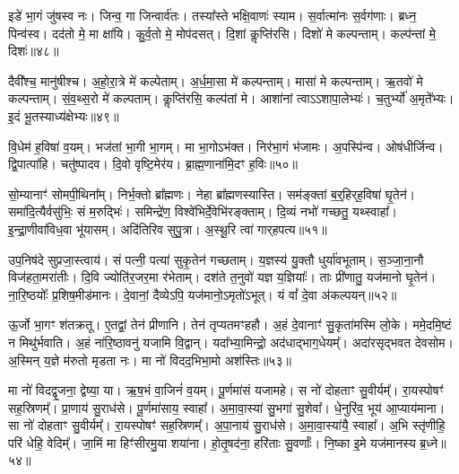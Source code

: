 इडे॑ भा॒गं जु॑षस्व नः।
जिन्व॒ गा जिन्वार्व॑तः।
तस्या᳚स्ते भक्षि॒वाणः॑ स्याम।
स॒र्वात्मा॑नः स॒र्वग॑णाः।
ब्रध्न॒ पिन्व॑स्व।
दद॑तो मे॒ मा क्षा॑यि।
कु॒र्व॒तो मे॒ मोप॑दसत्।
दि॒शां कॢप्ति॑रसि।
दिशो॑ मे कल्पन्ताम्।
कल्प॑न्तां मे॒ दिशः॑॥४८॥

दैवी᳚श्च॒ मानु॑षीश्च।
अ॒हो॒रा॒त्रे मे॑ कल्पेताम्।
अ॒र्ध॒मा॒सा मे॑ कल्पन्ताम्।
मासा॑ मे कल्पन्ताम्।
ऋ॒तवो॑ मे कल्पन्ताम्।
सं॒व॒थ्स॒रो मे॑ कल्पताम्।
कॢप्ति॑रसि॒ कल्प॑तां मे।
आशा॑नां त्वा\-ऽऽशापा॒लेभ्यः॑।
च॒तुर्भ्यो॑ अ॒मृते᳚भ्यः।
इ॒दं भू॒तस्याध्य॑क्षेभ्यः॥४९॥

वि॒धेम॑ ह॒विषा॑ व॒यम्।
भज॑तां भा॒गी भा॒गम्।
मा भा॒गो\-ऽभ॑क्त।
निर॑भा॒गं भ॑जामः।
अ॒पस्पि॑न्व।
ओष॑धीर्जिन्व।
द्वि॒पात्पा॑हि।
चतु॑ष्पादव।
दि॒वो वृष्टि॒मेर॑य।
ब्रा॒ह्म॒णाना॑मि॒दꣳ ह॒विः॥५०॥

सो॒म्यानाꣳ॑ सोमपी॒थिना᳚म्।
निर्भ॒क्तो ब्रा᳚ह्मणः।
नेहा ब्रा᳚ह्मणस्यास्ति।
सम॑ङ्क्तां ब॒र्॒हिर्‌\mbox{}ह॒विषा॑ घृ॒तेन॑।
समा॑दि॒त्यैर्वसु॑भिः॒ सं म॒रुद्भिः॑।
समिन्द्रे॑ण॒ विश्वे॑भिर्दे॒वेभि॑रङ्क्ताम्।
दि॒व्यं नभो॑ गच्छतु॒ यथ्स्वाहा᳚।
इ॒न्द्रा॒णीवा॑विध॒वा भू॑यासम्।
अदि॑तिरिव सुपु॒त्रा।
अ॒स्थू॒रि त्वा॑ गार्‌\mbox{}हपत्य॥५१॥

उप॒निष॑दे सुप्रजा॒स्त्वाय॑।
सं पत्नी॒ पत्या॑ सुकृ॒तेन॑ गच्छताम्।
य॒ज्ञस्य॑ यु॒क्तौ धुर्या॑वभूताम्।
स॒ञ्जा॒ना॒नौ विज॑हता॒मरा॑तीः।
दि॒वि ज्योति॑र॒जर॒मा र॑भेताम्।
दश॑ते त॒नुवो॑ यज्ञ य॒ज्ञियाः᳚।
ताः प्री॑णातु॒ यज॑मानो घृ॒तेन॑।
ना॒रि॒ष्ठयोः᳚ प्र॒शिष॒मीड॑मानः।
दे॒वानां॒ दैव्येऽपि॒ यज॑मानो॒\-ऽमृतो॑\-ऽभूत्।
यं वां᳚ दे॒वा अ॑कल्पयन्॥५२॥

ऊ॒र्जो भा॒गꣳ श॑तक्रतू।
ए॒तद्वां॒ तेन॑ प्रीणानि।
तेन॑ तृप्यतमꣳहहौ।
अ॒हं दे॒वानाꣳ॑ सु॒कृता॑मस्मि लो॒के।
ममे॒दमि॒ष्टं न मिथु॑र्भवाति।
अ॒हं ना॑रि॒ष्ठावनु॑ यजामि वि॒द्वान्।
यदा᳚भ्या॒मिन्द्रो॒ अद॑धाद्भाग॒धेयम्᳚।
अदा॑रसृद्भवत देवसोम।
अ॒स्मिन् य॒ज्ञे म॑रुतो मृडता नः।
मा नो॑ विदद॒भिभा॒मो अश॑स्तिः॥५३॥

मा नो॑ विदद्वृ॒जना॒ द्वेष्या॒ या।
ऋ॒ष॒भं वा॒जिनं॑ व॒यम्।
पू॒र्णमा॑सं यजामहे।
स नो॑ दोहताꣳ सु॒वीर्यम्᳚।
रा॒यस्पोषꣳ॑ सह॒स्रिणम्᳚।
प्रा॒णाय॑ सु॒राध॑से।
पू॒र्णमा॑साय॒ स्वाहा᳚।
अ॒मा॒वा॒स्या॑ सु॒भगा॑ सु॒शेवा᳚।
धे॒नुरि॑व॒ भूय॑ आ॒प्याय॑माना।
सा नो॑ दोहताꣳ सु॒वीर्यम्᳚।
रा॒यस्पोषꣳ॑ सह॒स्रिणम्᳚।
अ॒पा॒नाय॑ सु॒राध॑से।
अ॒मा॒वा॒स्या॑यै॒ स्वाहा᳚।
अ॒भि स्तृ॑णीहि॒ परि॑ धेहि॒ वेदिम्᳚।
जा॒मिं मा हिꣳ॑सीरमु॒या शया॑ना।
हो॒तृ॒षद॑ना॒ हरि॑ताः सु॒वर्णाः᳚।
नि॒ष्का इ॒मे यज॑मानस्य ब्र॒ध्ने॥५४॥


